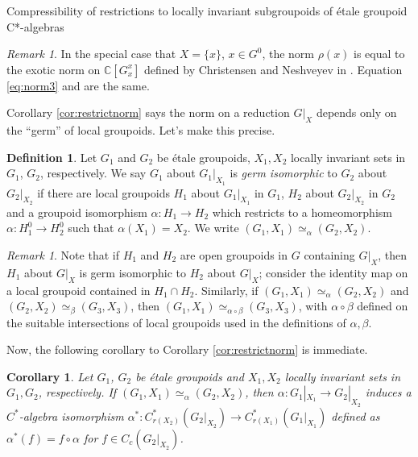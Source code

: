 \documentclass[a4paper, 12pt]{amsart}
\newtheorem{cor}[thm]{Corollary}
\theoremstyle{definition}
\newtheorem{dfn}[thm]{Definition}
\theoremstyle{remark}
\newtheorem{rmk}[thm]{Remark}
\numberwithin{equation}{section}
\begin{document}
\begin{section}{Compressibility of restrictions to locally invariant subgroupoids of \'etale groupoid C*-algebras}
\begin{rmk}
    In the special case that $X = \{x\}$, $x\in G^{0}$, the norm $\rho(x)$ is equal to the exotic norm on $\mathbb{C}[G^{x}_{x}]$ defined by Christensen and Neshveyev in \cite{CN22}. Equation \ref{eq:norm3} and \cite[Equation~2.3]{CN22} are the same.
\end{rmk}

Corollary \ref{cor:restrictnorm} says the norm on a reduction $G|_{X}$ depends only on the ``germ'' of local groupoids. Let's make this precise.

\begin{dfn}
\label{dfn:germiso}
    Let $G_{1}$ and $G_{2}$ be \'etale groupoids, $X_{1}, X_{2}$ locally invariant sets in $G_{1}$, $G_{2}$, respectively. We say $G_{1}$ about $G_{1}|_{X_{1}}$ is \emph{germ isomorphic} to $G_{2}$ about $G_{2}|_{X_{2}}$ if there are local groupoids $H_{1}$ about $G_{1}|_{X_{1}}$ in $G_{1}$, $H_{2}$ about $G_{2}|_{X_{2}}$ in $G_{2}$ and a groupoid isomorphism $\alpha:H_{1}\to H_{2}$ which restricts to a homeomorphism $\alpha:H^{0}_{1}\to H^{0}_{2}$ such that $\alpha(X_{1}) = X_{2}$. We write $(G_{1},X_{1})\simeq_{\alpha}(G_{2}, X_{2})$.
\end{dfn}

\begin{rmk}
    Note that if $H_{1}$ and $H_{2}$ are open groupoids in $G$ containing $G|_{X}$, then $H_{1}$ about $G|_{X}$ is germ isomorphic to $H_{2}$ about $G|_{X}$; consider the identity map on a local groupoid contained in $H_{1}\cap H_{2}$. Similarly, if $(G_{1},X_{1})\simeq_{\alpha}(G_{2}, X_{2})$ and $(G_{2}, X_{2})\simeq_{\beta}(G_{3}, X_{3})$, then $(G_{1},X_{1})\simeq_{\alpha\circ\beta}(G_{3}, X_{3})$, with $\alpha\circ\beta$ defined on the suitable intersections of local groupoids used in the definitions of $\alpha,\beta$.
\end{rmk}

Now, the following corollary to Corollary \ref{cor:restrictnorm} is immediate.

\begin{cor}
\label{cor:germnormiso}
    Let $G_{1}$, $G_{2}$ be \'etale groupoids and $X_{1}, X_{2}$ locally invariant sets in $G_{1}, G_{2}$, respectively. If $(G_{1}, X_{1})\simeq_{\alpha}(G_{2}, X_{2})$, then $\alpha:G_{1}|_{X_{1}}\to G_{2}|_{X_{2}}$ induces a $C^{*}$-algebra isomorphism $\alpha^{*}:C_{r(X_{2})}^{*}(G_{2}|_{X_{2}})\to C^{*}_{r(X_{1})}(G_{1}|_{X_{1}})$ defined as $\alpha^{*}(f) = f\circ\alpha$ for $f\in C_{c}(G_{2}|_{X_{2}})$.
\end{cor}


\end{section}
\end{document}
